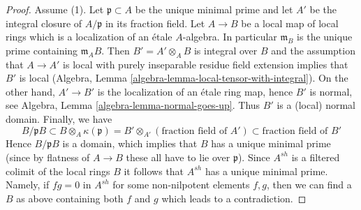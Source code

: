 \begin{proof}
\medskip\noindent
Assume (1). Let $\mathfrak p \subset A$ be the unique minimal
prime and let $A'$ be the integral closure of $A/\mathfrak p$
in its fraction field. Let $A \to B$ be a local map of local rings which is a
localization of an \'etale $A$-algebra. In particular $\mathfrak m_B$
is the unique prime containing $\mathfrak m_AB$. Then $B' = A' \otimes_A B$
is integral over $B$ and the assumption that $A \to A'$ is local
with purely inseparable residue field extension implies that $B'$
is local (Algebra, Lemma \ref{algebra-lemma-local-tensor-with-integral}).
On the other hand, $A' \to B'$ is the localization
of an \'etale ring map, hence $B'$ is normal, see
Algebra, Lemma \ref{algebra-lemma-normal-goes-up}.
Thus $B'$ is a (local) normal domain. Finally, we have
$$
B/\mathfrak pB \subset B \otimes_A \kappa(\mathfrak p)
= B' \otimes_{A'} (\text{fraction field of }A') \subset
\text{fraction field of }B'
$$
Hence $B/\mathfrak pB$ is a domain, which implies that $B$ has a unique
minimal prime (since by flatness of $A \to B$ these all have to lie
over $\mathfrak p$). Since $A^{sh}$ is a filtered colimit of
the local rings $B$ it follows that $A^{sh}$ has a unique minimal prime.
Namely, if $fg = 0$ in $A^{sh}$ for some non-nilpotent elements
$f, g$, then we can find a $B$ as above containing both $f$ and $g$
which leads to a contradiction.
\end{proof}